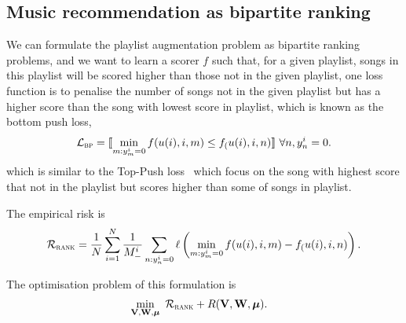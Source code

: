 \subsection{Music recommendation as bipartite ranking}

We can formulate the playlist augmentation problem as bipartite ranking problems, 
and we want to learn a scorer $f$ such that, for a given playlist, 
songs in this playlist will be scored higher than those not in the given playlist,
one loss function is to penalise the number of songs not in the given playlist 
but has a higher score than the song with lowest score in playlist, 
which is known as the bottom push loss,
\begin{equation*}
\mathcal{L}_\textsc{bp} = \llbracket \min_{m: y_m^i=0} f(u(i), i, m) \le f_(u(i), i, n) \rrbracket \ \forall n, y_n^i = 0.
\end{equation*}
which is similar to the Top-Push loss~\cite{li2014top} which focus on the song with highest score that not in the playlist 
but scores higher than some of songs in playlist.

The empirical risk is
$$
\mathcal{R}_\textsc{rank} 
= \frac{1}{N} \sum_{i=1}^N \frac{1}{M_-^i} \sum_{n: y_n^i = 0} \ell \left( \min_{m: y_m^i = 0} f(u(i), i, m) - f_(u(i), i, n) \right).
$$

The optimisation problem of this formulation is
\begin{equation}
\label{eq:unconsopt}
\begin{aligned}
&\min_{\mathbf{V}, \mathbf{W}, \bm{\mu}} \ \mathcal{R}_\textsc{rank} + R(\mathbf{V}, \mathbf{W}, \bm{\mu}).
\end{aligned}
\end{equation}
